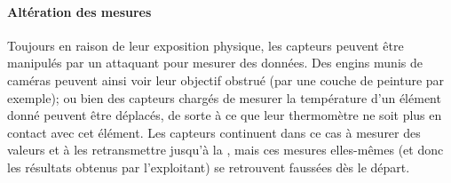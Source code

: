         \paragraph{Altération des mesures}
Toujours en raison de leur exposition physique, les capteurs peuvent être manipulés par un attaquant pour mesurer des données.
Des engins munis de caméras peuvent ainsi voir leur objectif obstrué (par une couche de peinture par exemple); ou bien des capteurs chargés de mesurer la température d'un élément donné peuvent être déplacés, de sorte à ce que leur thermomètre ne soit plus en contact avec cet élément.
Les capteurs continuent dans ce cas à mesurer des valeurs et à les retransmettre jusqu'à la \sdb, mais ces mesures elles-mêmes (et donc les résultats obtenus par l'exploitant) se retrouvent faussées dès le départ.


